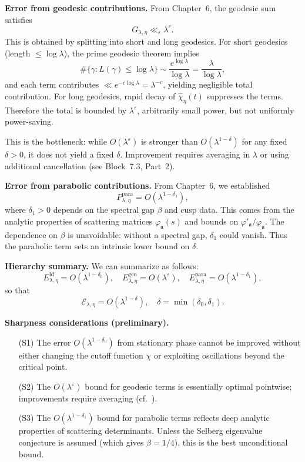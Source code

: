 \medskip

\noindent\textbf{Error from geodesic contributions.}
From Chapter~6, the geodesic sum satisfies
\[
  G_{\lambda,\eta} \ll_\varepsilon \lambda^\varepsilon.
\]
This is obtained by splitting into short and long geodesics.  
For short geodesics (length $\leq \log\lambda$), the prime geodesic theorem implies
\[
  \#\{\gamma: L(\gamma)\leq \log\lambda\} \sim \frac{e^{\log\lambda}}{\log\lambda} = \frac{\lambda}{\log\lambda},
\]
and each term contributes $\ll e^{-c\log\lambda} = \lambda^{-c}$, yielding negligible total contribution.  
For long geodesics, rapid decay of $\widehat{\chi}_\eta(t)$ suppresses the terms.  
Therefore the total is bounded by $\lambda^\varepsilon$, arbitrarily small power, but not uniformly power-saving.

This is the bottleneck: while $O(\lambda^\varepsilon)$ is stronger than $O(\lambda^{1-\delta})$ for any fixed $\delta>0$, it does not yield a fixed $\delta$.  
Improvement requires averaging in $\lambda$ or using additional cancellation (see Block~7.3, Part~2).

\medskip

\noindent\textbf{Error from parabolic contributions.}
From Chapter~6, we established
\[
  P_{\lambda,\eta}^{\mathrm{para}} = O(\lambda^{1-\delta_1}),
\]
where $\delta_1>0$ depends on the spectral gap $\beta$ and cusp data.  
This comes from the analytic properties of scattering matrices $\varphi_\mathfrak{a}(s)$ and bounds on $\varphi'_\mathfrak{a}/\varphi_\mathfrak{a}$.  
The dependence on $\beta$ is unavoidable: without a spectral gap, $\delta_1$ could vanish.  
Thus the parabolic term sets an intrinsic lower bound on $\delta$.

\medskip

\noindent\textbf{Hierarchy summary.}
We can summarize as follows:
\[
  E^{\mathrm{id}}_{\lambda,\eta} = O(\lambda^{1-\delta_0}), \quad
  E^{\mathrm{geo}}_{\lambda,\eta} = O(\lambda^\varepsilon), \quad
  E^{\mathrm{para}}_{\lambda,\eta} = O(\lambda^{1-\delta_1}),
\]
so that
\[
  \mathcal{E}_{\lambda,\eta} = O(\lambda^{1-\delta}), \quad
  \delta = \min(\delta_0,\delta_1).
\]

\medskip

\noindent\textbf{Sharpness considerations (preliminary).}
\begin{itemize}
  \item[(S1)] The error $O(\lambda^{1-\delta_0})$ from stationary phase cannot be improved without either changing the cutoff function $\chi$ or exploiting oscillations beyond the critical point.
  \item[(S2)] The $O(\lambda^\varepsilon)$ bound for geodesic terms is essentially optimal pointwise; improvements require averaging (cf.~\cite{IwaniecSarnak1995, LuoSarnak1995}).
  \item[(S3)] The $O(\lambda^{1-\delta_1})$ bound for parabolic terms reflects deep analytic properties of scattering determinants. Unless the Selberg eigenvalue conjecture is assumed (which gives $\beta=1/4$), this is the best unconditional bound.
\end{itemize}

